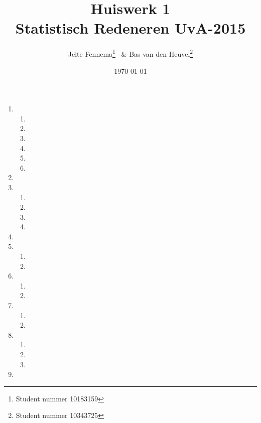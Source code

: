 \documentclass{article}
\title{Huiswerk 1\\ \large{Statistisch Redeneren UvA-2015}}
\author{Jelte Fennema\thanks{Student nummer 10183159} ~\& Bas van den
Heuvel\thanks{Student nummer 10343725}}
\date{\today}
\begin{document}
\maketitle

\begin{enumerate}
    \item
        \begin{enumerate}
            \item
            \item
            \item
            \item
            \item
            \item
        \end{enumerate}

    \item

    \item
        \begin{enumerate}
            \item
            \item
            \item
            \item
        \end{enumerate}

    \item

    \item
        \begin{enumerate}
            \item
            \item
        \end{enumerate}

    \item
        \begin{enumerate}
            \item
            \item
        \end{enumerate}

    \item
        \begin{enumerate}
            \item
            \item
        \end{enumerate}

    \item
        \begin{enumerate}
            \item
            \item
            \item
        \end{enumerate}

    \item

\end{enumerate}
\end{document}
